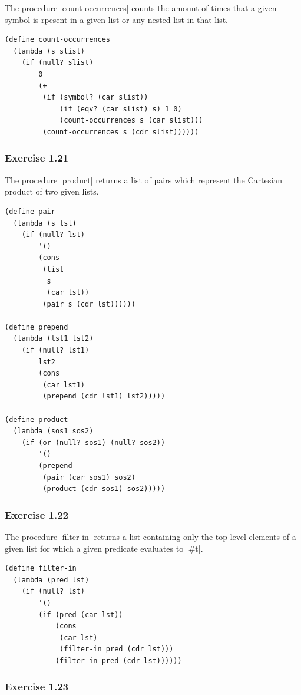 \documentclass[a4paper]{article}
\begin{document}
The procedure |count-occurrences| counts the amount of times that a given symbol is rpesent in a given list or any nested list in that list.

\begin{lstlisting}
(define count-occurrences
  (lambda (s slist)
    (if (null? slist)
        0
        (+
         (if (symbol? (car slist))
             (if (eqv? (car slist) s) 1 0)
             (count-occurrences s (car slist)))
         (count-occurrences s (cdr slist))))))
\end{lstlisting}

\subsubsection{Exercise 1.21}

The procedure |product| returns a list of pairs which represent the Cartesian product of two given lists.

\begin{lstlisting}
(define pair
  (lambda (s lst)
    (if (null? lst)
        '()
        (cons
         (list
          s
          (car lst))
         (pair s (cdr lst))))))

(define prepend
  (lambda (lst1 lst2)
    (if (null? lst1)
        lst2
        (cons
         (car lst1)
         (prepend (cdr lst1) lst2)))))

(define product
  (lambda (sos1 sos2)
    (if (or (null? sos1) (null? sos2))
        '()
        (prepend
         (pair (car sos1) sos2)
         (product (cdr sos1) sos2)))))
\end{lstlisting}

\subsubsection{Exercise 1.22}

The procedure |filter-in| returns a list containing only the top-level elements of a given list for which a given predicate evaluates to |#t|.

\begin{lstlisting}
(define filter-in
  (lambda (pred lst)
    (if (null? lst)
        '()
        (if (pred (car lst))
            (cons
             (car lst)
             (filter-in pred (cdr lst)))
            (filter-in pred (cdr lst))))))
\end{lstlisting}

\subsubsection{Exercise 1.23}
\end{document}
